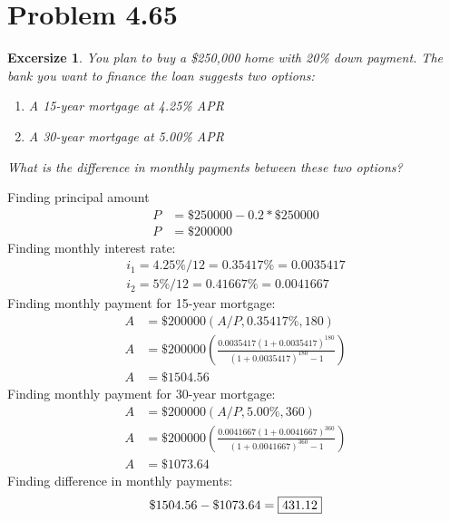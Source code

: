 \documentclass[../INDE250HW.tex]{subfiles}
\newtheorem{exrc}{Excersize}
\begin{document}
\section*{Problem 4.65}
\begin{exrc}
    You plan to buy a \$250,000 home with 20\% down payment. The bank you want to finance the loan suggests two options:
    \begin{enumerate}
        \item A 15-year mortgage at 4.25\% APR
        \item A 30-year mortgage at 5.00\% APR
    \end{enumerate}
    What is the difference in monthly payments between these two options?
\end{exrc}
Finding principal amount
\begin{equation*}
    \begin{aligned}
        P &= \$250000 - 0.2 * \$250000 \\
        P &= \$200000
    \end{aligned}
\end{equation*}
Finding monthly interest rate:
\begin{equation*}
    \begin{aligned}
        i_1 = 4.25\%/12 = 0.35417\% = 0.0035417 \\
        i_2 = 5\%/12 = 0.41667\% = 0.0041667
    \end{aligned}
\end{equation*}
Finding monthly payment for 15-year mortgage:
\begin{equation*}
    \begin{aligned}
        A &= \$200000(A/P,0.35417\%,180) \\
        A &= \$200000\left(\frac{0.0035417(1+0.0035417)^{180}}{(1+0.0035417)^{180}-1}\right) \\
        A &= \$1504.56
    \end{aligned}
\end{equation*} 
Finding monthly payment for 30-year mortgage:
\begin{equation*}
    \begin{aligned}
        A &= \$200000(A/P,5.00\%,360) \\
        A &= \$200000\left(\frac{0.0041667(1+0.0041667)^{360}}{(1+0.0041667)^{360}-1}\right) \\
        A &= \$1073.64
    \end{aligned}
\end{equation*}
Finding difference in monthly payments:
\begin{equation*}
    \begin{aligned}
        \$1504.56 - \$1073.64 = \framebox{$431.12$}
    \end{aligned}
\end{equation*}
\end{document}
